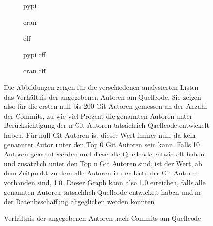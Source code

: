 \begin{figure}
    \begin{subfigure}{.5\textwidth}
        \centering
        
        \caption{\gls{pypi}}
        \label{fig:common_authors_2_pypi}
    \end{subfigure}%
    \begin{subfigure}{.5\textwidth}
        \centering
        
        \caption{\gls{cran}}
        \label{fig:common_authors_2_cran}
    \end{subfigure}
    \begin{subfigure}{.5\textwidth}
        \centering
        
        \caption{\gls{cff}}
        \label{fig:common_authors_2_cff}
    \end{subfigure}%
    \begin{subfigure}{.5\textwidth}
        \centering
        
        \caption{\gls{pypi} \gls{cff}}
        \label{fig:common_authors_2_pypi_cff}
    \end{subfigure}
    \centering
    \begin{subfigure}{.5\textwidth}
        \centering
        
        \caption{\gls{cran} \gls{cff}}
        \label{fig:common_authors_2_cran_cff}
    \end{subfigure}
    \caption{Verhältnis der angegebenen Autoren nach Commits am Quellcode}
    \label{fig:common_authors_2}
    \small
    Die Abbildungen zeigen für die verschiedenen analysierten Listen das Verhältnis der angegebenen Autoren am Quellcode. Sie zeigen also für die ersten null bis 200 Git Autoren gemessen an der Anzahl der Commits, zu wie viel Prozent die genannten Autoren unter Berücksichtigung der n Git Autoren tatsächlich Quellcode entwickelt haben. Für null Git Autoren ist dieser Wert immer null, da kein genannter Autor unter den Top 0 Git Autoren sein kann. Falls 10 Autoren genannt werden und diese alle Quellcode entwickelt haben und zusätzlich unter den Top n Git Autoren sind, ist der Wert, ab dem Zeitpunkt zu dem alle Autoren in der Liste der Git Autoren vorhanden sind, 1.0. Dieser Graph kann also 1.0 erreichen, falls alle genannten Autoren tatsächlich Quellcode entwickelt haben und in der Datenbeschaffung abgeglichen werden konnten.
\end{figure}

